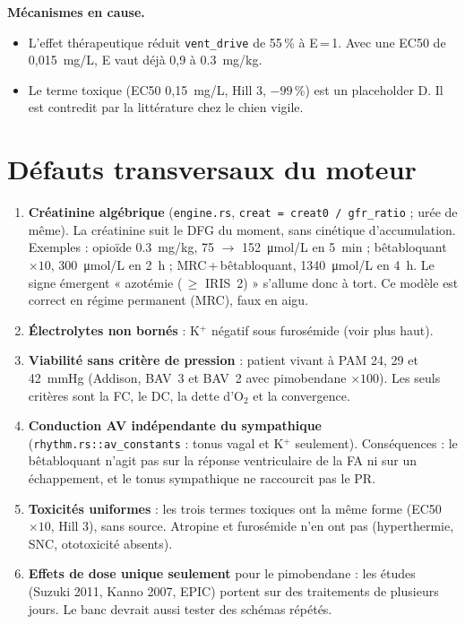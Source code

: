 \documentclass[10pt,a4paper]{article}
\newcommand{\cmd}[1]{\texttt{#1}}
\begin{document}
\textbf{Mécanismes en cause.}
\begin{itemize}
\item L'effet thérapeutique réduit \cmd{vent\_drive} de 55\,\% à E\,=\,1. Avec une EC50 de 0,015~mg/L, E vaut déjà 0,9 à \SI{0,3}{mg/kg}.
\item Le terme toxique (EC50 0,15~mg/L, Hill 3, $-99$\,\%) est un placeholder D. Il est contredit par la littérature chez le chien vigile.
\end{itemize}

\section{Défauts transversaux du moteur}

\begin{enumerate}
\item \textbf{Créatinine algébrique} (\cmd{engine.rs}, \cmd{creat = creat0 / gfr\_ratio} ; urée de même). La créatinine suit le DFG du moment, sans cinétique d'accumulation. Exemples : opioïde \SI{0,3}{mg/kg}, 75 $\rightarrow$ \SI{152}{\micro mol/L} en 5~min ; bêtabloquant $\times 10$, \SI{300}{\micro mol/L} en 2~h ; MRC\,+\,bêtabloquant, \SI{1340}{\micro mol/L} en 4~h. Le signe émergent « azotémie (\,$\geq$ IRIS~2) » s'allume donc à tort. Ce modèle est correct en régime permanent (MRC), faux en aigu.
\item \textbf{Électrolytes non bornés} : K$^+$ négatif sous furosémide (voir plus haut).
\item \textbf{Viabilité sans critère de pression} : patient vivant à PAM 24, 29 et \SI{42}{mmHg} (Addison, BAV~3 et BAV~2 avec pimobendane $\times 100$). Les seuls critères sont la FC, le DC, la dette d'O$_2$ et la convergence.
\item \textbf{Conduction AV indépendante du sympathique} (\cmd{rhythm.rs::av\_constants} : tonus vagal et K$^+$ seulement). Conséquences : le bêtabloquant n'agit pas sur la réponse ventriculaire de la FA ni sur un échappement, et le tonus sympathique ne raccourcit pas le PR.
\item \textbf{Toxicités uniformes} : les trois termes toxiques ont la même forme (EC50 $\times 10$, Hill 3), sans source. Atropine et furosémide n'en ont pas (hyperthermie, SNC, ototoxicité absents).
\item \textbf{Effets de dose unique seulement} pour le pimobendane : les études (Suzuki 2011, Kanno 2007, EPIC) portent sur des traitements de plusieurs jours. Le banc devrait aussi tester des schémas répétés.
\end{enumerate}
\end{document}
